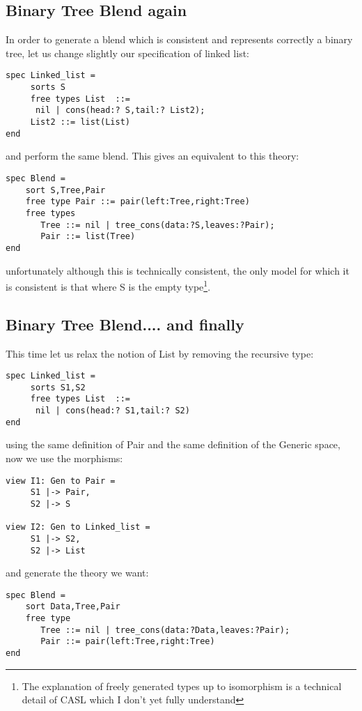 \documentclass{blue-book}
\begin{document}
\subsection{Binary Tree Blend again}

In order to generate a blend which is consistent and represents correctly a binary tree, let us change slightly our specification of linked list:
\begin{verbatim}
spec Linked_list =
     sorts S
     free types List  ::=
	  nil | cons(head:? S,tail:? List2);
     List2 ::= list(List)
end
\end{verbatim}
and perform the same blend. This gives an equivalent to this theory:
\begin{verbatim}
spec Blend = 
    sort S,Tree,Pair
    free type Pair ::= pair(left:Tree,right:Tree)
    free types
       Tree ::= nil | tree_cons(data:?S,leaves:?Pair);
       Pair ::= list(Tree)
end
\end{verbatim}
\noindent unfortunately although this is technically consistent, the only model for which it is consistent is that where S is the empty type\footnote{The explanation of freely generated types up to isomorphism is a technical detail of CASL which I don't yet fully understand}.

\subsection{Binary Tree Blend.... and finally}

This time let us relax the notion of List by removing the recursive type:
\begin{verbatim}
spec Linked_list =
     sorts S1,S2
     free types List  ::=
	  nil | cons(head:? S1,tail:? S2)
end
\end{verbatim}
using the same definition of Pair and the same definition of the Generic space, now we use the morphisms:
\begin{verbatim}
view I1: Gen to Pair = 
     S1 |-> Pair,
     S2 |-> S

view I2: Gen to Linked_list = 
     S1 |-> S2,
     S2 |-> List
\end{verbatim}
\noindent and generate the theory we want:
\begin{verbatim}
spec Blend = 
    sort Data,Tree,Pair
    free type
       Tree ::= nil | tree_cons(data:?Data,leaves:?Pair);
       Pair ::= pair(left:Tree,right:Tree) 
end
\end{verbatim}
\end{document}
